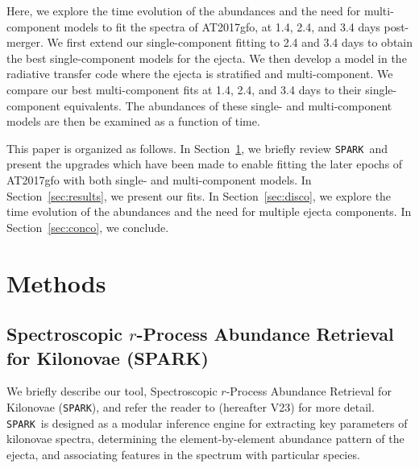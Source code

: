 \documentclass[twocolumn, twocolappendix]{aastex63}
\def\SPARK{\texttt{SPARK}}
\begin{document}
Here, we explore the time evolution of the abundances and the need for multi-component models to fit the spectra of AT2017gfo, at 1.4, 2.4, and 3.4 days post-merger. We first extend our single-component fitting to 2.4 and 3.4 days to obtain the best single-component models for the ejecta. We then develop a model in the radiative transfer code where the ejecta is stratified and multi-component. We compare our best multi-component fits at 1.4, 2.4, and 3.4 days to their single-component equivalents. The abundances of these single- and multi-component models are then be examined as a function of time. 

This paper is organized as follows. In Section~\ref{sec:methods}, we briefly review \SPARK~and present the upgrades which have been made to enable fitting the later epochs of AT2017gfo with both single- and multi-component models. In Section~\ref{sec:results}, we present our fits. In Section~\ref{sec:disco}, we explore the time evolution of the abundances and the need for multiple ejecta components. In Section~\ref{sec:conco}, we conclude.





\section{Methods}\label{sec:methods}

\subsection{Spectroscopic $r$-Process Abundance Retrieval for Kilonovae (\textsc{SPARK})}\label{ssc:spark-summary}

We briefly describe our tool, Spectroscopic $r$-Process Abundance Retrieval for Kilonovae (\SPARK), and refer the reader to \cite{vieira23} (hereafter V23) for more detail. \SPARK~is designed as a modular inference engine for extracting key parameters of kilonovae spectra, determining the element-by-element abundance pattern of the ejecta, and associating features in the spectrum with particular species. 
\end{document}
